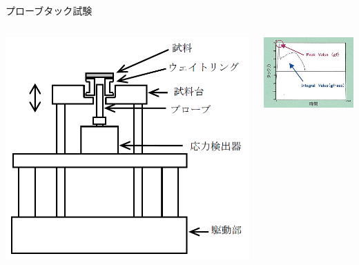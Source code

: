 \documentclass[unicode,12pt]{beamer}%
\begin{document}
\begin{frame}
\begin{block}{プローブタック試験}
\begin{columns}[c, onlytextwidth]
			\includegraphics[width=\textwidth]{probtack.png}

			\includegraphics[width=\textwidth]{probtack_2.jpg}
		\end{columns}
	\end{block}
\end{frame}
\end{document}
